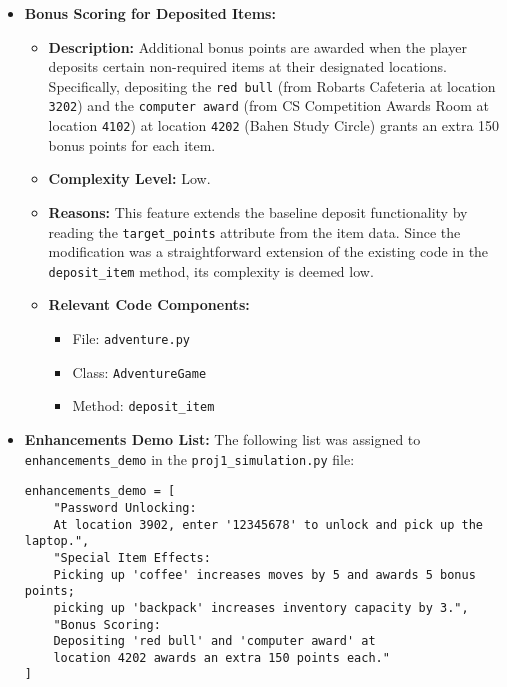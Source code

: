 \documentclass[11pt]{article}
\begin{document}
\begin{enumerate}
\begin{itemize}
    \item \textbf{Bonus Scoring for Deposited Items:}
    \begin{itemize}
        \item \textbf{Description:}  
        Additional bonus points are awarded when the player deposits certain non-required items at their designated locations. Specifically, depositing the \texttt{red bull} (from Robarts Cafeteria at location \texttt{3202}) and the \texttt{computer award} (from CS Competition Awards Room at location \texttt{4102}) at location \texttt{4202} (Bahen Study Circle) grants an extra 150 bonus points for each item.
        \item \textbf{Complexity Level:} Low.
        \item \textbf{Reasons:}  
        This feature extends the baseline deposit functionality by reading the \texttt{target\_points} attribute from the item data. Since the modification was a straightforward extension of the existing code in the \texttt{deposit\_item} method, its complexity is deemed low.
        \item \textbf{Relevant Code Components:}  
        \begin{itemize}
            \item File: \texttt{adventure.py}
            \item Class: \texttt{AdventureGame}
            \item Method: \texttt{deposit\_item}
        \end{itemize}
    \end{itemize}

    \item \textbf{Enhancements Demo List:}  
    The following list was assigned to \texttt{enhancements\_demo} in the \texttt{proj1\_simulation.py} file:
    \begin{verbatim}
enhancements_demo = [
    "Password Unlocking: 
    At location 3902, enter '12345678' to unlock and pick up the laptop.",
    "Special Item Effects: 
    Picking up 'coffee' increases moves by 5 and awards 5 bonus points; 
    picking up 'backpack' increases inventory capacity by 3.",
    "Bonus Scoring: 
    Depositing 'red bull' and 'computer award' at 
    location 4202 awards an extra 150 points each."
]
    \end{verbatim}
    \end{itemize}

\end{enumerate}
\end{document}
